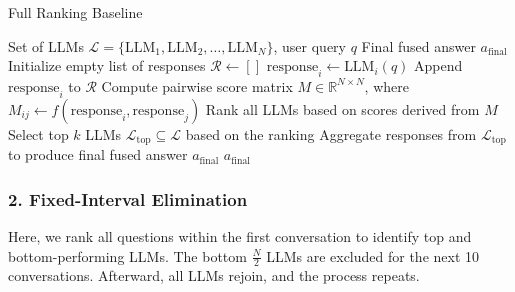 \documentclass[sigconf,authordraft]{acmart}
\begin{document}
\begin{algorithm}[H]
\caption{Full Ranking Baseline}
\label{alg:full_ranking}
\begin{algorithmic}[1]
\Require Set of LLMs $\mathcal{L} = \{\text{LLM}_1, \text{LLM}_2, \dots, \text{LLM}_N\}$, user query $q$
\Ensure Final fused answer $a_{\text{final}}$
\State Initialize empty list of responses $\mathcal{R} \gets []$
    \State $\text{response}_i \gets \text{LLM}_i(q)$ 
    \State Append $\text{response}_i$ to $\mathcal{R}$
\EndFor
\State Compute pairwise score matrix $M \in \mathbb{R}^{N \times N}$, where $M_{ij} \gets f(\text{response}_i, \text{response}_j)$
\State Rank all LLMs based on scores derived from $M$ 
\State Select top $k$ LLMs $\mathcal{L}_{\text{top}} \subseteq \mathcal{L}$ based on the ranking
\State Aggregate responses from $\mathcal{L}_{\text{top}}$ to produce final fused answer $a_{\text{final}}$
\Return $a_{\text{final}}$
\end{algorithmic}
\end{algorithm}




\subsubsection{2. Fixed-Interval Elimination}
Here, we rank all questions within the first conversation to identify top and bottom-performing LLMs. The bottom \( \frac{N}{2} \) LLMs are excluded for the next 10 conversations. Afterward, all LLMs rejoin, and the process repeats.
\end{document}
